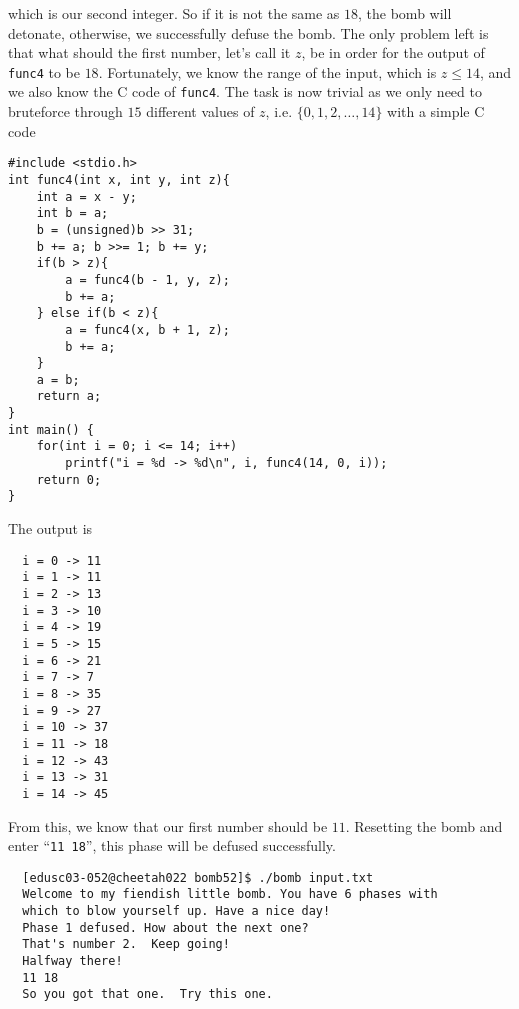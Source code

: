 which is our second integer. So if it is not the same as $18$, the bomb will detonate, otherwise, we successfully defuse the bomb. The only problem left is that what should the first number, let's call it $z$, be in order for the output of \verb+func4+ to be $18$. Fortunately, we know the range of the input, which is $z \leq 14$, and we also know the C code of \verb+func4+. The task is now trivial as we only need to bruteforce through $15$ different values of $z$, i.e. $\{0, 1, 2, \dots, 14\}$ with a simple C code
{\renewcommand\fcolorbox[4][]{\textcolor{black}{\strut#4}}
\begin{verbatim}
#include <stdio.h>
int func4(int x, int y, int z){
    int a = x - y;
    int b = a;
    b = (unsigned)b >> 31;
    b += a; b >>= 1; b += y;
    if(b > z){
        a = func4(b - 1, y, z);
        b += a;
    } else if(b < z){
        a = func4(x, b + 1, z);
        b += a;
    }
    a = b;
    return a;
}
int main() {
    for(int i = 0; i <= 14; i++)
        printf("i = %d -> %d\n", i, func4(14, 0, i));
    return 0;
}
\end{verbatim}
}\noindent
The output is
\begin{verbatim}
  i = 0 -> 11
  i = 1 -> 11
  i = 2 -> 13
  i = 3 -> 10
  i = 4 -> 19
  i = 5 -> 15
  i = 6 -> 21
  i = 7 -> 7
  i = 8 -> 35
  i = 9 -> 27
  i = 10 -> 37
  i = 11 -> 18
  i = 12 -> 43
  i = 13 -> 31
  i = 14 -> 45
\end{verbatim}
From this, we know that our first number should be $11$. Resetting the bomb and enter ``\verb+11 18+'', this phase will be defused successfully.
{\renewcommand\fcolorbox[4][]{\textcolor{black}{\strut#4}}
\begin{verbatim}
  [edusc03-052@cheetah022 bomb52]$ ./bomb input.txt
  Welcome to my fiendish little bomb. You have 6 phases with
  which to blow yourself up. Have a nice day!
  Phase 1 defused. How about the next one?
  That's number 2.  Keep going!
  Halfway there!
  11 18
  So you got that one.  Try this one.
\end{verbatim}
}


\newpage